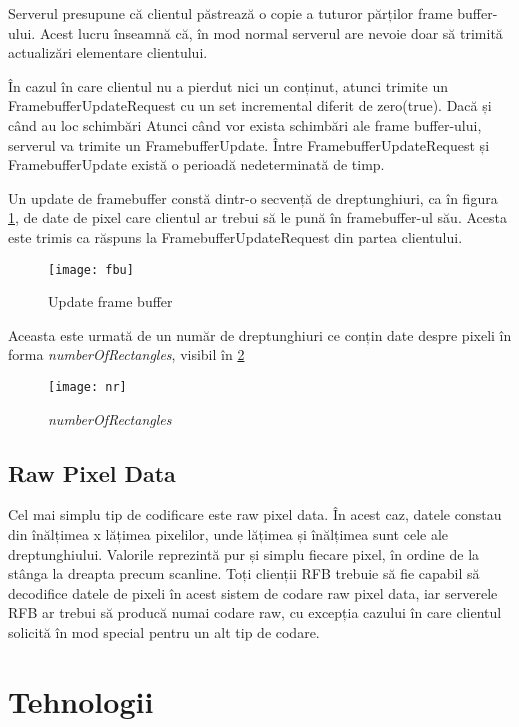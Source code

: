 Serverul presupune că clientul păstrează o copie a tuturor părților frame buffer-ului. Acest lucru înseamnă că, în mod normal serverul are nevoie doar să trimită actualizări elementare clientului.

În cazul în care clientul nu a pierdut nici un conținut, atunci trimite un FramebufferUpdateRequest cu un set incremental diferit de zero(true). Dacă și când au loc schimbări Atunci când vor exista schimbări ale frame buffer-ului, serverul va trimite un FramebufferUpdate. Între FramebufferUpdateRequest
și FramebufferUpdate există o perioadă nedeterminată de timp.

Un update de framebuffer constă dintr-o secvență de dreptunghiuri, ca în figura \ref{fbu}, de date de pixel care clientul ar trebui să le pună în framebuffer-ul său. Acesta este trimis ca răspuns la FramebufferUpdateRequest din partea clientului. 

\begin{figure}
    \centering
    \texttt{[image: fbu]}
    \caption{Update frame buffer }
    \label{fbu}
\end{figure}	

Aceasta este urmată de un număr de dreptunghiuri ce conțin date despre pixeli în forma \textit{numberOfRectangles}, visibil în \ref{nr}

\begin{figure}
    \centering
    \texttt{[image: nr]}
    \caption{\textit{numberOfRectangles}}
    \label{nr}
\end{figure}	

\subsection{Raw Pixel Data}

Cel mai simplu tip de codificare este raw pixel data. În acest caz, datele constau din înălțimea x lățimea pixelilor, unde lățimea și înălțimea sunt cele ale dreptunghiului. Valorile reprezintă pur și simplu fiecare pixel, în ordine de la stânga la dreapta precum scanline. Toți clienții RFB trebuie să fie capabil să decodifice datele de pixeli în acest sistem de codare raw pixel data, iar serverele RFB ar trebui să producă numai codare raw, cu excepția cazului în care clientul solicită în mod special pentru un alt
tip de codare.



\section{Tehnologii}


